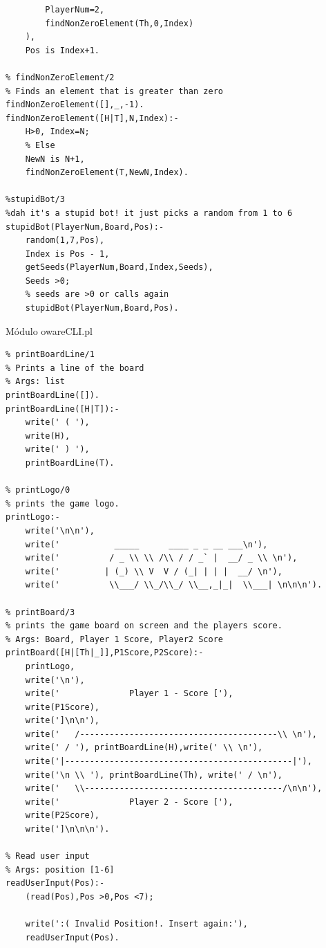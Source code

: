 \documentclass[15pt,a4paper]{article}
\begin{document}
\begin{verbatim}
		PlayerNum=2,
		findNonZeroElement(Th,0,Index)
	),
	Pos is Index+1.
	
% findNonZeroElement/2
% Finds an element that is greater than zero
findNonZeroElement([],_,-1).
findNonZeroElement([H|T],N,Index):-
	H>0, Index=N;
	% Else
	NewN is N+1,
	findNonZeroElement(T,NewN,Index).

%stupidBot/3
%dah it's a stupid bot! it just picks a random from 1 to 6
stupidBot(PlayerNum,Board,Pos):-	
	random(1,7,Pos),
	Index is Pos - 1,
	getSeeds(PlayerNum,Board,Index,Seeds),
	Seeds >0;
	% seeds are >0 or calls again
	stupidBot(PlayerNum,Board,Pos).
\end{verbatim}

Módulo owareCLI.pl

\begin{verbatim}
% printBoardLine/1
% Prints a line of the board
% Args: list
printBoardLine([]).
printBoardLine([H|T]):-
	write(' ( '),
	write(H),
	write(' ) '),
	printBoardLine(T).
	
% printLogo/0
% prints the game logo.
printLogo:-
	write('\n\n'),
	write('           _____      ____ _ _ __ ___\n'), 
	write('          / _ \\ \\ /\\ / / _` |  __/ _ \\ \n'),
	write('         | (_) \\ V  V / (_| | | |  __/ \n'),
	write('          \\___/ \\_/\\_/ \\__,_|_|  \\___| \n\n\n').

% printBoard/3
% prints the game board on screen and the players score.
% Args: Board, Player 1 Score, Player2 Score
printBoard([H|[Th|_]],P1Score,P2Score):-
	printLogo,
	write('\n'),
	write('              Player 1 - Score ['),
	write(P1Score),
	write(']\n\n'),
	write('   /----------------------------------------\\ \n'),
	write(' / '), printBoardLine(H),write(' \\ \n'),
	write('|----------------------------------------------|'),
	write('\n \\ '), printBoardLine(Th), write(' / \n'),
	write('   \\----------------------------------------/\n\n'),
	write('              Player 2 - Score ['),
	write(P2Score),
	write(']\n\n\n').
	
% Read user input
% Args: position [1-6]
readUserInput(Pos):-
	(read(Pos),Pos >0,Pos <7);

	write(':( Invalid Position!. Insert again:'),
	readUserInput(Pos).
\end{verbatim}
\end{document}
